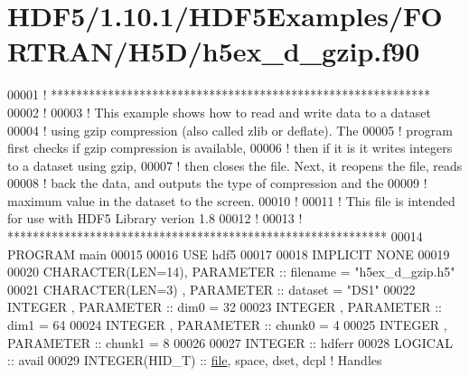 \hypertarget{_h_d_f5_21_810_81_2_h_d_f5_examples_2_f_o_r_t_r_a_n_2_h5_d_2h5ex__d__gzip_8f90_source}{}\section{H\+D\+F5/1.10.1/\+H\+D\+F5\+Examples/\+F\+O\+R\+T\+R\+A\+N/\+H5\+D/h5ex\+\_\+d\+\_\+gzip.f90}
\label{_h_d_f5_21_810_81_2_h_d_f5_examples_2_f_o_r_t_r_a_n_2_h5_d_2h5ex__d__gzip_8f90_source}

\begin{DoxyCode}
00001 \textcolor{comment}{! ************************************************************}
00002 \textcolor{comment}{!}
00003 \textcolor{comment}{!  This example shows how to read and write data to a dataset}
00004 \textcolor{comment}{!  using gzip compression (also called zlib or deflate).  The}
00005 \textcolor{comment}{!  program first checks if gzip compression is available,}
00006 \textcolor{comment}{!  then if it is it writes integers to a dataset using gzip,}
00007 \textcolor{comment}{!  then closes the file.  Next, it reopens the file, reads}
00008 \textcolor{comment}{!  back the data, and outputs the type of compression and the}
00009 \textcolor{comment}{!  maximum value in the dataset to the screen.}
00010 \textcolor{comment}{!}
00011 \textcolor{comment}{!  This file is intended for use with HDF5 Library verion 1.8}
00012 \textcolor{comment}{!}
00013 \textcolor{comment}{! ************************************************************}
00014 \textcolor{keyword}{PROGRAM} main
00015 
00016   \textcolor{keywordtype}{USE }hdf5
00017 
00018   \textcolor{keywordtype}{IMPLICIT NONE}
00019 
00020   \textcolor{keywordtype}{CHARACTER(LEN=14)}, \textcolor{keywordtype}{PARAMETER} :: filename = \textcolor{stringliteral}{"h5ex\_d\_gzip.h5"}
00021   \textcolor{keywordtype}{CHARACTER(LEN=3)} , \textcolor{keywordtype}{PARAMETER} :: dataset  = \textcolor{stringliteral}{"DS1"}
00022   \textcolor{keywordtype}{INTEGER}          , \textcolor{keywordtype}{PARAMETER} :: dim0     = 32
00023   \textcolor{keywordtype}{INTEGER}          , \textcolor{keywordtype}{PARAMETER} :: dim1     = 64
00024   \textcolor{keywordtype}{INTEGER}          , \textcolor{keywordtype}{PARAMETER} :: chunk0   = 4
00025   \textcolor{keywordtype}{INTEGER}          , \textcolor{keywordtype}{PARAMETER} :: chunk1   = 8
00026 
00027   \textcolor{keywordtype}{INTEGER} :: hdferr
00028   \textcolor{keywordtype}{LOGICAL}         :: avail
00029   \textcolor{keywordtype}{INTEGER(HID\_T)}  :: \hyperlink{structfile}{file}, space, dset, dcpl \textcolor{comment}{! Handles}

\end{DoxyCode}
